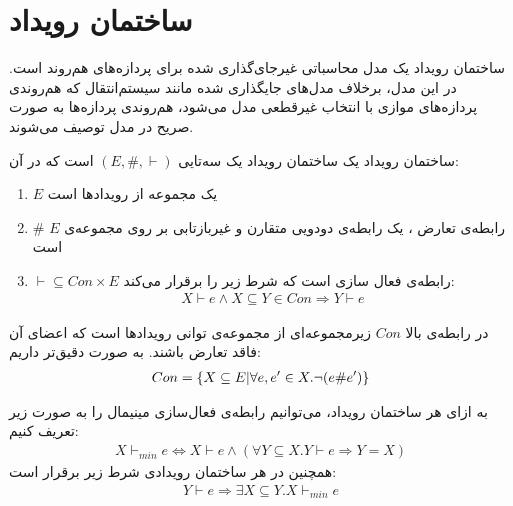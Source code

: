 \section{ساختمان رویداد}
ساختمان رویداد
\cite{es}
یک مدل محاسباتی
غیر‌جای‌گذاری شده
برای پردازه‌های هم‌روند
است.
در این مدل، برخلاف مدل‌های جایگذاری شده
مانند سیستم‌انتقال که هم‌روندی پردازه‌های موازی با انتخاب غیرقطعی مدل می‌شود، هم‌روندی پردازه‌ها به صورت صریح در مدل توصیف می‌شوند.
\begin{definition}{ساختمان رویداد}
    یک ساختمان رویداد یک سه‌تایی
    $(E,\#,\vdash)$
    است که در آن:
    \begin{enumerate}
        \item $E$
              یک مجموعه از رویداد‌ها است
        \item $\#$
              رابطه‌ی تعارض
              ، یک رابطه‌ی دودویی متقارن و غیربازتابی بر روی مجموعه‌ی
              $E$
              است
        \item $\vdash \subseteq Con \times E$
              رابطه‌ی فعال سازی
              است که شرط زیر را برقرار می‌کند:
              \begin{align*}
                  X \vdash e \wedge X \subseteq Y \in Con
                  \Rightarrow Y \vdash e
              \end{align*}
    \end{enumerate}
    در رابطه‌ی بالا
    $Con$
    زیرمجموعه‌ای از مجموعه‌ی توانی رویدادها است که اعضای آن فاقد تعارض باشند.
    به صورت دقیق‌تر داریم:
    \begin{align*}
        Con = \{X \subseteq E| \forall e,e' \in X. \neg(e\#e')\}
    \end{align*}
\end{definition}
\begin{definition}
    به ازای هر ساختمان رویداد، می‌توانیم رابطه‌ی فعال‌سازی مینیمال را به صورت زیر تعریف کنیم:
    \begin{align*}
        X \vdash_{min} e \iff X \vdash e \wedge
        ( \forall Y \subseteq X . Y \vdash e \Rightarrow Y = X )
    \end{align*}
    همچنین در هر ساختمان رویدادی شرط زیر برقرار است:
    \begin{align*}
        Y \vdash e \Rightarrow \exists X \subseteq Y . X \vdash_{min} e
    \end{align*}
\end{definition}

